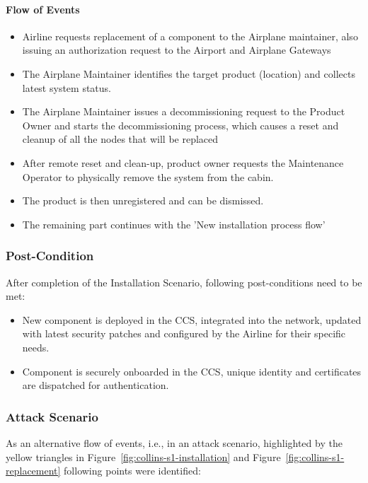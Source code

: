 \paragraph{Flow of Events}

\begin{itemize}
	\item Airline requests replacement of a component to the Airplane maintainer, also issuing an authorization
	      request to the Airport and Airplane Gateways
	\item The Airplane Maintainer identifies the target product (location) and collects latest system status.
	\item The Airplane Maintainer issues a decommissioning request to the Product Owner and starts the
	      decommissioning process, which causes a reset and cleanup of all the nodes that will be replaced
	\item After remote reset and clean-up, product owner requests the Maintenance Operator to physically remove the
	      system from the cabin.
	\item The product is then unregistered and can be dismissed.
	\item The remaining part continues with the 'New installation process flow'
\end{itemize}

\subsubsection{Post-Condition}

After completion of the Installation Scenario, following post-conditions need to be met:

\begin{itemize}
	\item New component is deployed in the CCS, integrated into the network, updated with latest security patches
	      and configured by the Airline for their specific needs.
	\item Component is securely onboarded in the CCS, unique identity and certificates are dispatched for
	      authentication.
\end{itemize}

\subsubsection{Attack Scenario}

As an alternative flow of events, i.e., in an attack scenario, highlighted by the yellow triangles in
Figure~\ref{fig:collins-s1-installation} and Figure~\ref{fig:collins-s1-replacement} following points were identified:

